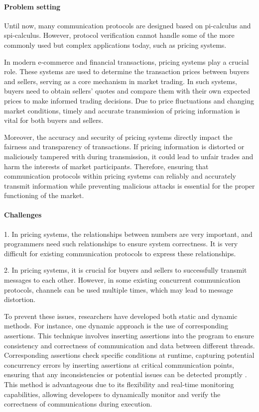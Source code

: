 \documentclass[master,english]{kuisthesis}
\begin{document}
\paragraph{Problem setting}
Until now, many communication protocols are designed based on pi-calculus and spi-calculus. However, protocol verification cannot handle some of the more commonly used but complex applications today, such as pricing systems.


In modern e-commerce and financial transactions, pricing systems play a crucial role. These systems are used to determine the transaction prices between buyers and sellers, serving as a core mechanism in market trading. In such systems, buyers need to obtain sellers' quotes and compare them with their own expected prices to make informed trading decisions. Due to price fluctuations and changing market conditions, timely and accurate transmission of pricing information is vital for both buyers and sellers.

Moreover, the accuracy and security of pricing systems directly impact the fairness and transparency of transactions. If pricing information is distorted or maliciously tampered with during transmission, it could lead to unfair trades and harm the interests of market participants. Therefore, ensuring that communication protocols within pricing systems can reliably and accurately transmit information while preventing malicious attacks is essential for the proper functioning of the market.



\paragraph{Challenges}

1. In pricing systems, the relationships between numbers are very important, and programmers need such relationships to ensure system correctness. It is very difficult for existing communication protocols to express these relationships.

2. In pricing systems, it is crucial for buyers and sellers to successfully transmit messages to each other. However, in some existing concurrent communication protocols, channels can be used multiple times, which may lead to message distortion.



To prevent these issues, researchers have developed both static and dynamic methods. For instance, one dynamic approach is the use of corresponding assertions. This technique involves inserting assertions into the program to ensure consistency and correctness of communication and data between different threads. Corresponding assertions check specific conditions at runtime, capturing potential concurrency errors by inserting assertions at critical communication points, ensuring that any inconsistencies or potential issues can be detected promptly \cite{?}. This method is advantageous due to its flexibility and real-time monitoring capabilities, allowing developers to dynamically monitor and verify the correctness of communications during execution.
\end{document}

